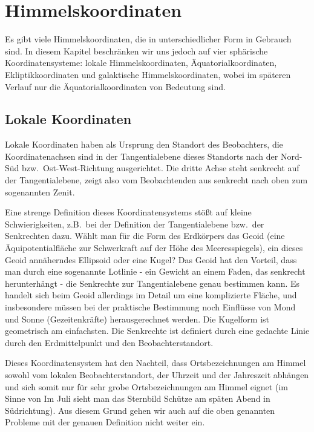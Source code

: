 \section{Himmelskoordinaten}

Es gibt viele Himmelskoordinaten, die in unterschiedlicher Form in Gebrauch sind. In diesem
Kapitel beschr\"anken wir uns jedoch auf vier sph\"arische Koordinatensysteme: lokale Himmelskoordinaten,
\"Aquatorialkoordinaten, Ekliptikkoordinaten und galaktische Himmelskoordinaten, wobei im sp\"ateren
Verlauf nur die \"Aquatorialkoordinaten von Bedeutung sind.  

\subsection{Lokale Koordinaten}

Lokale Koordinaten 
haben als Ursprung den Standort des Beobachters, die
Koordinatenachsen sind in der Tangentialebene dieses Standorts nach der Nord-S\"ud bzw.\
Ost-West-Richtung ausgerichtet. Die dritte Achse steht senkrecht auf der Tangentialebene,
zeigt also vom Beobachtenden aus senkrecht nach oben zum sogenannten Zenit. 

Eine strenge Definition dieses Koordinatensystems st\"o\ss t auf kleine Schwierigkeiten,
z.B.\ bei der Definition der Tangentialebene bzw.\ der Senkrechten dazu. W\"ahlt man f\"ur die Form des
Erdk\"orpers das Geoid\index{Geoid} 
(eine \"Aquipotentialfl\"ache zur Schwerkraft auf der H\"ohe des
Meeresspiegels), ein dieses Geoid ann\"aherndes Ellipsoid oder eine Kugel? Das Geoid hat den
Vorteil, dass man durch eine sogenannte\index{Lotlinie} 
Lotlinie - ein Gewicht an einem Faden, das senkrecht
herunterh\"angt - die Senkrechte zur Tangentialebene genau bestimmen kann. Es handelt sich beim
Geoid allerdings im Detail um eine komplizierte Fl\"ache, und insbesondere m\"ussen bei der
praktische Bestimmung noch Einfl\"usse von Mond und Sonne (Gezeitenkr\"afte) herausgerechnet
werden. Die Kugelform ist geometrisch am einfachsten. Die Senkrechte ist definiert durch eine
gedachte Linie durch den Erdmittelpunkt und den Beobachterstandort. 

Dieses Koordinatensystem hat den Nachteil, dass Ortsbezeichnungen am Himmel sowohl
vom lokalen Beobachterstandort, der Uhrzeit und der Jahreszeit abh\"angen und sich somit
nur f\"ur sehr grobe Ortsbezeichnungen am Himmel eignet (im Sinne von \glqq Im Juli sieht man 
das Sternbild Sch\"utze am sp\"aten Abend in S\"udrichtung\grqq). Aus diesem Grund gehen wir
auch auf die oben genannten Probleme mit der genauen Definition nicht weiter ein.

